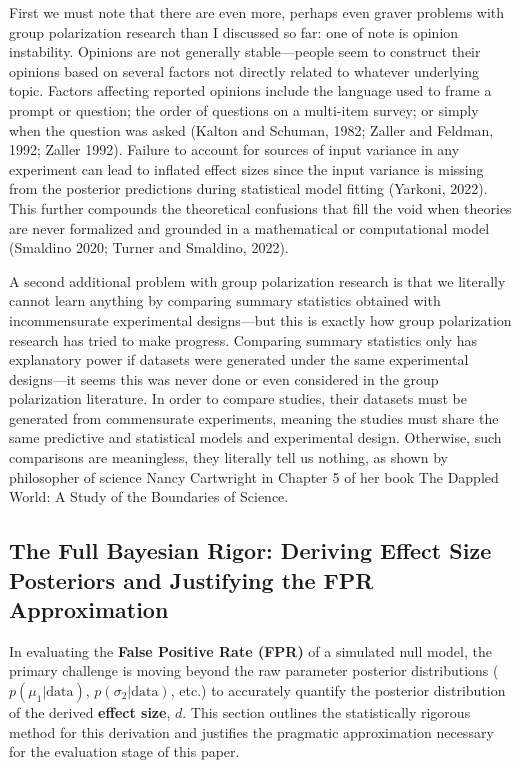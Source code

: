 \documentclass[preview]{article}
\begin{document}
First we must note that there are even more, perhaps even graver problems
with group polarization research than I discussed so far: one of note is
opinion instability. Opinions are not generally stable—people seem to
construct their opinions based on several factors not directly related to
whatever underlying topic. Factors affecting reported opinions include the
language used to frame a prompt or question; the order of questions on a
multi-item survey; or simply when the question was asked (Kalton and Schuman,
1982; Zaller and Feldman, 1992; Zaller 1992). Failure to account for sources
of input variance in any experiment can lead to inflated effect sizes since
the input variance is missing from the posterior predictions during
statistical model fitting (Yarkoni, 2022). This further compounds the
theoretical confusions that fill the void when theories are never formalized
and grounded in a mathematical or computational model (Smaldino 2020; Turner
and Smaldino, 2022).

A second additional problem with group polarization research is that we literally cannot learn anything by comparing summary statistics obtained with incommensurate experimental designs—but this is exactly how group polarization research has tried to make progress. Comparing summary statistics only has explanatory power if datasets were generated under the same experimental designs—it seems this was never done or even considered in the group polarization literature. In order to compare studies, their datasets must be generated from commensurate experiments, meaning the studies must share the same predictive and statistical models and experimental design. Otherwise, such comparisons are meaningless, they literally tell us nothing, as shown by philosopher of science Nancy Cartwright in Chapter 5 of her book The Dappled World: A Study of the Boundaries of Science.

\subsection{The Full Bayesian Rigor: Deriving Effect Size Posteriors and Justifying the FPR Approximation}

In evaluating the \textbf{False Positive Rate (FPR)} of a simulated null model, the primary challenge is moving beyond the raw parameter posterior distributions ($p(\mu_1 | \text{data})$, $p(\sigma_2 | \text{data})$, etc.) to accurately quantify the posterior distribution of the derived \textbf{effect size}, $d$. This section outlines the statistically rigorous method for this derivation and justifies the pragmatic approximation necessary for the evaluation stage of this paper.
\end{document}
